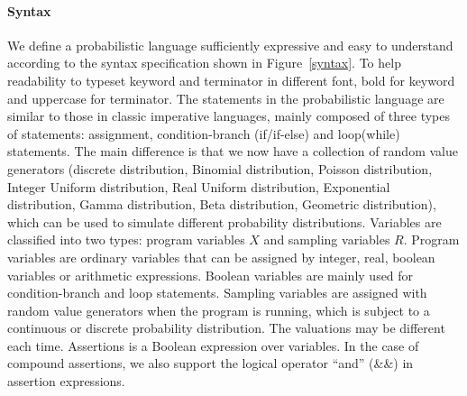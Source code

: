 \documentclass[conference]{IEEEtran}
\begin{document}
\paragraph{Syntax} We define a probabilistic language sufficiently expressive and easy to understand according to the syntax specification shown in Figure~\ref{syntax}. To help readability to typeset keyword and terminator in different font, bold for keyword and uppercase for terminator. The statements in the probabilistic language are similar to those in classic imperative languages, mainly composed of three types of statements: assignment, condition-branch (if/if-else) and loop(while) statements. The main difference is that we now have a collection of random value generators (discrete distribution, Binomial distribution, Poisson distribution, Integer Uniform distribution, Real Uniform distribution, Exponential distribution, Gamma distribution, Beta distribution, Geometric distribution), which can be used to simulate different probability distributions. Variables are classified into two types: program variables $X$ and sampling variables $R$. Program variables are ordinary variables that can be assigned by integer, real, boolean variables or arithmetic expressions. Boolean variables are mainly used for condition-branch and loop statements. Sampling variables are assigned with random value generators when the program is running, which is subject to a continuous or discrete probability distribution. The valuations may be different each time. Assertions is a Boolean expression over variables. In the case of compound assertions, we also support the logical operator ``and'' (\&\&) in assertion expressions.
\end{document}
